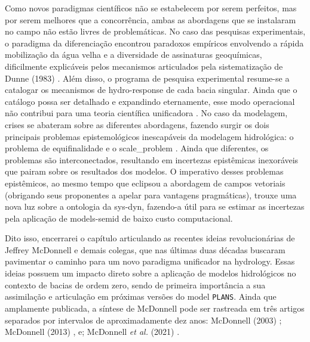 \documentclass[./main.tex]{subfiles}
\begin{document}
\par Como novos paradigmas científicos não se estabelecem por serem perfeitos, mas por serem melhores que a concorrência, ambas as abordagens que se instalaram no campo não estão livres de problemáticas. No caso das pesquisas experimentais, o \gls{paradigma} da diferenciação encontrou paradoxos empíricos envolvendo a rápida mobilização da água velha e a diversidade de assinaturas geoquímicas, dificilmente explicáveis pelos mecanismos articulados pela sistematização de Dunne (1983) \cite{Dunne1983}. Além disso, o programa de pesquisa experimental resume-se a catalogar os mecanismos de \gls{hydro-response} de cada bacia singular. Ainda que o catálogo possa ser detalhado e expandindo eternamente, esse modo operacional não contribui para uma \gls{teoria} científica unificadora \cite{Mcdonnell2003a}. No caso da modelagem, crises se abateram sobre as diferentes abordagens, fazendo surgir os dois principais problemas epistemológicos inescapáveis da modelagem hidrológica: o problema de equifinalidade e o \gls{scale_problem} \cite{Beven1996a}. Ainda que diferentes, os problemas são interconectados, resultando em incertezas epistêmicas inexoráveis que pairam sobre os resultados dos modelos. O imperativo desses problemas epistêmicos, ao mesmo tempo que eclipsou a abordagem de campos vetoriais (obrigando seus proponentes a apelar para vantagens pragmáticas), trouxe uma nova luz sobre a ontologia da \gls{sys-dyn}, fazendo-a útil para se estimar as incertezas pela aplicação de \gls{models-semid} de baixo custo computacional.

\par Dito isso, encerrarei o capítulo articulando as recentes ideias revolucionárias de Jeffrey McDonnell e demais colegas, que nas últimas duas décadas buscaram pavimentar o caminho para um novo \gls{paradigma} unificador na \gls{hydrology}. Essas ideias possuem um impacto direto sobre a aplicação de modelos hidrológicos no contexto de bacias de ordem zero, sendo de primeira importância a sua assimilação e articulação em próximas versões do \gls{model} \texttt{PLANS}. Ainda que amplamente publicada, a síntese de McDonnell pode ser rastreada em três artigos separados por intervalos de aproximadamente dez anos: McDonnell (2003) \cite{Mcdonnell2003a}; McDonnell (2013) \cite{Mcdonnell2013}, e; McDonnell \textit{et al.} (2021) \cite{mcdonnell2021}.
\end{document}
